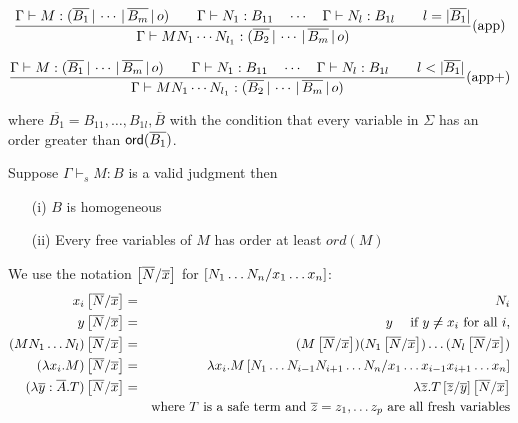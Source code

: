 \[ {{{{\Gamma} \vdash {M : (\overline{B_1} \, | \, \cdots \, | \, \overline{B_m} \, | \, o)}} \qquad
{{\Gamma} \vdash {N_1 : B_{11}}} \quad \cdots \quad {{\Gamma} \vdash {N_{l} :
B_{1l}}} \qquad l = |\overline{B_1}| } \over{ {{\Gamma} \vdash {M N_1
\cdots N_{l_1} : (\overline{B_2} \, | \, \cdots \, | \,
\overline{B_m} \, | \, o)}}}} (\mbox{app})\]


\[ {{{{\Gamma} \vdash {M : (\overline{B_1} \, | \, \cdots \, | \, \overline{B_m} \, | \, o)}} \qquad
{{\Gamma} \vdash {N_1 : B_{11}}} \quad \cdots \quad {{\Gamma} \vdash {N_{l} :
B_{1l}}} \qquad l < |\overline{B_1}| } \over{ {{\Gamma} \vdash {M N_1
\cdots N_{l_1} : (\overline{B_2} \, | \, \cdots \, | \,
\overline{B_m} \, | \, o)}}}} (\mbox{app+})\]

where $\overline{B_1} = B_{11}, \ldots, B_{1l},\overline{B}$ with
the condition that every variable in $\Sigma$ has an order greater
than ${\sf ord}(\overline{B_1})$.


\begin{lem}
\label{lem:safe_basic_prop} Suppose $\Gamma \vdash_s M : B$ is a
valid judgment then

\begin{itemize}
\item[(i)] $B$ is homogeneous
\item[(ii)] Every free variables of $M$ has order at least $ord(M)$
\end{itemize}
\end{lem}


\begin{dfn}
\label{dnf:safe_simsubst}
 We use the notation
$\left[ \overline{N}/\overline{x} \right]$ for $\left[ N_1 \ldots N_n/x_1
\ldots x_n \right]$:
\begin{eqnarray*}
x_i \left[ \overline{N}/\overline{x} \right] &=& N_i\\
 y \left[ \overline{N}/\overline{x} \right] &=& y \quad \mbox{ if } y \not \neq x_i \mbox{ for all } i,\\
(M N_1 \ldots N_l) \left[ \overline{N}/\overline{x} \right] &=& (M \left[ \overline{N}/\overline{x} \right]) (N_1 \left[ \overline{N}/\overline{x} \right]) \ldots  (N_l \left[ \overline{N}/\overline{x} \right])\\
(\lambda x_i . M) \left[ \overline{N}/\overline{x} \right] &=& \lambda x_i
. M
\left[ N_1 \ldots N_{i-1} N_{i+1}\ldots N_n/x_1 \ldots x_{i-1} x_{i+1}\ldots x_n \right] \\
(\lambda \overline{y} : \overline{A}. T)
\left[ \overline{N}/\overline{x} \right] &=& \lambda \overline{z} . T
\left[ \overline{z}/\overline{y} \right]
\left[ \overline{N}/\overline{x} \right] \\
&& \mbox{where $T$ is a safe
term and $\overline{z} = z_1, \ldots z_p$ are all fresh variables}\\
\end{eqnarray*}
\end{dfn}

